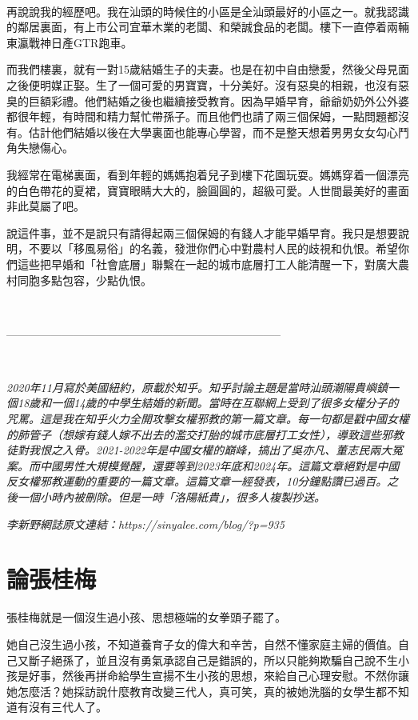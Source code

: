 \ 

再說說我的經歷吧。我在汕頭的時候住的小區是全汕頭最好的小區之一。就我認識的鄰居裏面，有上市公司宜華木業的老闆、和榮誠食品的老闆。樓下一直停着兩輛東瀛戰神日產GTR跑車。

而我們樓裏，就有一對15歲結婚生子的夫妻。也是在初中自由戀愛，然後父母見面之後便明媒正娶。生了一個可愛的男寶寶，十分美好。沒有惡臭的相親，也沒有惡臭的巨額彩禮。他們結婚之後也繼續接受教育。因為早婚早育，爺爺奶奶外公外婆都很年輕，有時間和精力幫忙帶孫子。而且他們也請了兩三個保姆，一點問題都沒有。估計他們結婚以後在大學裏面也能專心學習，而不是整天想着男男女女勾心鬥角失戀傷心。

我經常在電梯裏面，看到年輕的媽媽抱着兒子到樓下花園玩耍。媽媽穿着一個漂亮的白色帶花的夏裙，寶寶眼睛大大的，臉圓圓的，超級可愛。人世間最美好的畫面非此莫屬了吧。

說這件事，並不是說只有請得起兩三個保姆的有錢人才能早婚早育。我只是想要說明，不要以「移風易俗」的名義，發泄你們心中對農村人民的歧視和仇恨。希望你們這些把早婚和「社會底層」聯繫在一起的城市底層打工人能清醒一下，對廣大農村同胞多點包容，少點仇恨。

\ 

--------------------------------------------------------------------------

\ 

\textit{2020年11月寫於美國紐約，原載於知乎。知乎討論主題是當時汕頭潮陽貴嶼鎮一個18歲和一個14歲的中學生結婚的新聞。當時在互聯網上受到了很多女權分子的咒罵。這是我在知乎火力全開攻擊女權邪教的第一篇文章。每一句都是戳中國女權的肺管子（想嫁有錢人嫁不出去的濫交打胎的城市底層打工女性），導致這些邪教徒對我恨之入骨。2021-2022年是中國女權的巔峰，搞出了吳亦凡、董志民兩大冤案。而中國男性大規模覺醒，還要等到2023年底和2024年。這篇文章絕對是中國反女權邪教運動的重要的一篇文章。這篇文章一經發表，10分鐘點讚已過百。之後一個小時內被刪除。但是一時「洛陽紙貴」，很多人複製抄送。}

\textit{李新野網誌原文連結：https://sinyalee.com/blog/?p=935}

\newpage

\section{論張桂梅}

張桂梅就是一個沒生過小孩、思想極端的女拳頭子罷了。

她自己沒生過小孩，不知道養育子女的偉大和辛苦，自然不懂家庭主婦的價值。自己又斷子絕孫了，並且沒有勇氣承認自己是錯誤的，所以只能夠欺騙自己說不生小孩是好事，然後再拼命給學生宣揚不生小孩的思想，來給自己心理安慰。不然你讓她怎麼活？她採訪說什麼教育改變三代人，真可笑，真的被她洗腦的女學生都不知道有沒有三代人了。

